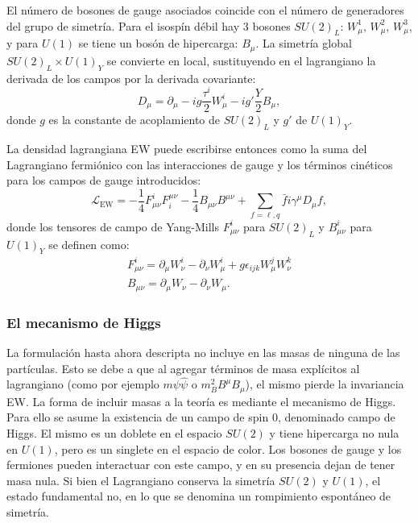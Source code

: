El número de bosones de gauge asociados coincide con el número de generadores del grupo de simetría. Para el isospín débil hay 3 bosones \(SU(2)_L\): \(W_{\mu}^1,\, W_{\mu}^2,\, W_{\mu}^3\), y para \(U(1)\) se tiene un bosón de hipercarga: \(B_{\mu}\).
La simetría global \(SU(2)_L \times U(1)_Y\) se convierte en local, sustituyendo en el lagrangiano la derivada de los campos por la derivada covariante:
\begin{equation}
    \label{eq:theory:sm:mathematical:ew:covariant_derivative}
    D_{\mu} = \partial_{\mu} - ig \frac{\tau^i}{2} W_{\mu}^i - i g' \frac{Y}{2} B_{\mu},
\end{equation}
donde \(g\) es la constante de acoplamiento de \(SU(2)_L\) y \(g'\) de \(U(1)_Y\).

La densidad lagrangiana \ac{EW} puede escribirse entonces como la suma del Lagrangiano fermiónico con las interacciones de gauge y los términos cinéticos para los campos de gauge introducidos:
\begin{equation}
    \mathcal{L}_{\text{EW}} = 
    - \frac{1}{4} F_{\mu\nu}^i F^{\mu\nu}_i
    - \frac{1}{4} B_{\mu\nu} B^{\mu\nu}
    + \sum_{f = \ell, q} \bar{f} i \gamma^{\mu} D_{\mu} f,
\end{equation}
donde los tensores de campo de Yang-Mills \(F_{\mu\nu}^i\) para \(SU(2)_L\) y \(B_{\mu\nu}^i\) para \(U(1)_Y\) se definen como:
\begin{gather}
    F_{\mu\nu}^i = \partial_{\mu} W_{\nu}^i  -  \partial_{\nu} W_{\mu}^i + g \epsilon_{ijk} W_{\mu}^jW_{\nu}^k \\
    B_{\mu\nu} = \partial_{\mu} W_{\nu}  -  \partial_{\nu} W_{\mu}.
\end{gather}




\subsubsection{El mecanismo de Higgs}

La formulación hasta ahora descripta no incluye en las masas de ninguna de las partículas. Esto se debe a que al agregar términos de masa explícitos al lagrangiano (como por ejemplo \(m \psi \hat{\psi}\) o \(m_B^2 B^{\mu}B_{\mu}\)), el mismo pierde la invariancia \ac{EW}. La forma de incluir masas a la teoría es mediante el mecanismo de Higgs. Para ello se asume la existencia de un campo de spin 0, denominado campo de Higgs. El mismo es un doblete en el espacio \(SU(2)\) y tiene hipercarga no nula en \(U(1)\), pero es un singlete en el espacio de color. Los bosones de gauge y los fermiones pueden interactuar con este campo, y en su presencia dejan de tener masa nula. Si bien el Lagrangiano conserva la simetría \(SU(2)\) y \(U(1)\), el estado fundamental no, en lo que se denomina un rompimiento espontáneo de simetría.

